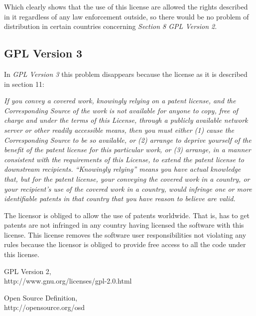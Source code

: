 \documentclass[11pt]{scrartcl}
\begin{document}
Which clearly shows that the use of this license are allowed the rights described in it regardless of any law enforcement outside, so there would be no problem of distribution in certain countries concerning \emph{Section 8 GPL Version 2}.

\subsection{GPL Version 3}

In \emph{GPL Version 3} this problem disappears because the license as it is described in section 11:

\emph{If you convey a covered work, knowingly relying on a patent license, and the Corresponding Source of the work is not available for anyone to copy, free of charge and under the terms of this License, through a publicly available network server or other readily accessible means, then you must either (1) cause the Corresponding Source to be so available, or (2) arrange to deprive yourself of the benefit of the patent license for this particular work, or (3) arrange, in a manner consistent with the requirements of this License, to extend the patent license to downstream recipients. “Knowingly relying” means you have actual knowledge that, but for the patent license, your conveying the covered work in a country, or your recipient's use of the covered work in a country, would infringe one or more identifiable patents in that country that you have reason to believe are valid.}

The licensor is obliged to allow the use of patents worldwide. That is, has to get patents are not infringed in any country having licensed the software with this license.
This license removes the software user responsibilities not violating any rules because the licensor is obliged to provide free access to all the code under this license.

\begin{thebibliography}{9}

    GPL Version 2,\\
    http://www.gnu.org/licenses/gpl-2.0.html

    Open Source Definition,\\
    http://opensource.org/osd    

\end{thebibliography}
\end{document}

